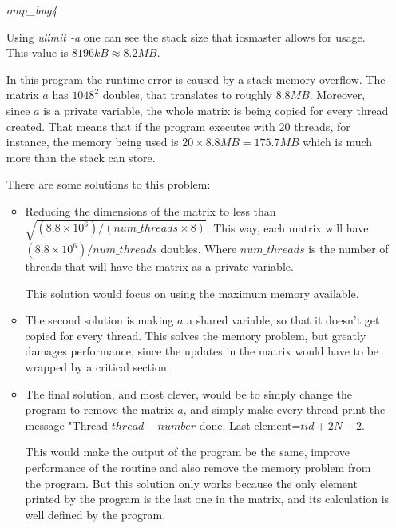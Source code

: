 \documentclass[unicode,11pt,a4paper,oneside,numbers=endperiod,openany]{scrartcl}
\begin{document}
\begin{itemize}
        \item[\textit{omp\_bug4}]

            Using \textit{ulimit -a} one can see the stack size that icsmaster allows for usage.
            This value is $8196kB \approx 8.2 MB$.

            In this program the runtime error is caused by a stack memory overflow.
            The matrix $a$ has $1048^2$ doubles, that translates to roughly $8.8MB$.
            Moreover, since $a$ is a private variable, the whole matrix is being copied for every thread created.
            That means that if the program executes with 20 threads, for instance, the memory being used is $20 \times 8.8MB = 175.7MB$ which is much more than the stack can store.

            There are some solutions to this problem:

            \begin{itemize}
                \item 
                    Reducing the dimensions of the matrix to less than $\sqrt{(8.8\times 10^6)/(num\_threads\times 8)}$. 
                    This way, each matrix will have $(8.8\times 10^6)/num\_threads$ doubles.
                    Where $num\_threads$ is the number of threads that will have the matrix as a private variable.

                    This solution would focus on using the maximum memory available.

                \item 
                    The second solution is making $a$ a shared variable, so that it doesn't get copied for every thread.
                    This solves the memory problem, but greatly damages performance, since the updates in the matrix would have to be wrapped by a critical section.

                \item 
                    The final solution, and most clever, would be to simply change the program to remove the matrix $a$, and simply make every thread print the message "Thread $thread-number$ done. Last element=$tid + 2N-2$.

                    This would make the output of the program be the same, improve performance of the routine and also remove the memory problem from the program.
                    But this solution only works because the only element printed by the program is the last one in the matrix, and its calculation is well defined by the program.
            \end{itemize}



\end{itemize}
\end{document}
